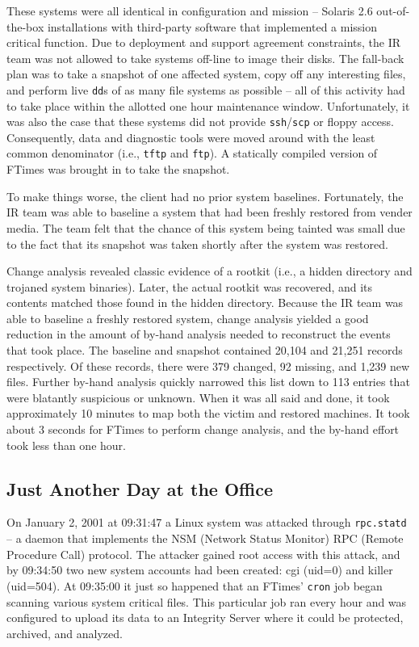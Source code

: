 \documentclass[10pt]{article}
\begin{document}
These systems were all identical in configuration and mission --
Solaris 2.6 out-of-the-box installations with third-party software
that implemented a mission critical function.  Due to deployment and
support agreement constraints, the IR team was not allowed to take
systems off-line to image their disks.  The fall-back plan was to take
a snapshot of one affected system, copy off any interesting files, and
perform live \texttt{dd}s of as many file systems as possible -- all
of this activity had to take place within the allotted one hour
maintenance window.  Unfortunately, it was also the case that these
systems did not provide \texttt{ssh}/\texttt{scp} or floppy access.
Consequently, data and diagnostic tools were moved around with the
least common denominator (i.e.,  \texttt{tftp} and \texttt{ftp}).  A
statically compiled version of FTimes was brought in to take the
snapshot.

To make things worse, the client had no prior system baselines.
Fortunately, the IR team was able to baseline a system that had been
freshly restored from vender media.  The team felt that the chance of
this system being tainted was small due to the fact that its snapshot
was taken shortly after the system was restored.

Change analysis revealed classic evidence of a rootkit (i.e., a hidden
directory and trojaned system binaries).  Later, the actual rootkit
was recovered, and its contents matched those found in the hidden
directory.  Because the IR team was able to baseline a freshly
restored system, change analysis yielded a good reduction in the
amount of by-hand analysis needed to reconstruct the events that took
place.  The baseline and snapshot contained 20,104 and 21,251 records
respectively.  Of these records, there were 379 changed, 92 missing,
and 1,239 new files.  Further by-hand analysis quickly narrowed this
list down to 113 entries that were blatantly suspicious or unknown.
When it was all said and done, it took approximately 10 minutes to map
both the victim and restored machines.  It took about 3 seconds for
FTimes to perform change analysis, and the by-hand effort took less
than one hour.

\subsection{Just Another Day at the Office}

On January 2, 2001 at 09:31:47 a Linux system was attacked through
\texttt{rpc.statd} -- a daemon that implements the NSM (Network Status
Monitor) RPC (Remote Procedure Call) protocol.  The attacker gained
root access with this attack, and by 09:34:50 two new system accounts
had been created: cgi (uid=0) and killer (uid=504).  At 09:35:00 it
just so happened that an FTimes' \texttt{cron} job began scanning
various system critical files.  This particular job ran every hour and
was configured to upload its data to an Integrity Server where it
could be protected, archived, and analyzed.
\end{document}

